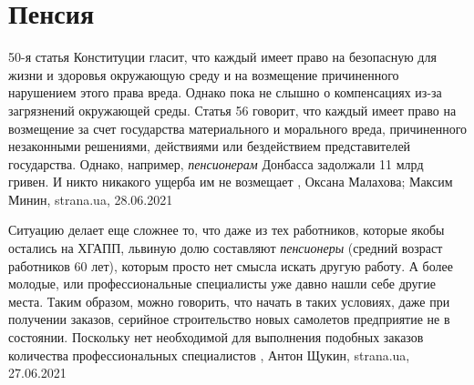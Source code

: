 
 
 
 
 
\chapter{Пенсия}
\label{sec:slova.pensia}

50-я статья Конституции гласит, что каждый имеет право на безопасную для жизни
и здоровья окружающую среду и на возмещение причиненного нарушением этого права
вреда.  Однако пока не слышно о компенсациях из-за загрязнений окружающей
среды.  Статья 56 говорит, что каждый имеет право на возмещение за счет
государства материального и морального вреда, причиненного незаконными
решениями, действиями или бездействием представителей государства.  Однако,
например, \emph{пенсионерам} Донбасса задолжали 11 млрд гривен. И никто
никакого ущерба им не возмещает
, 
Оксана Малахова; Максим Минин, strana.ua, 28.06.2021

Ситуацию делает еще сложнее то, что даже из тех работников, которые якобы
остались на ХГАПП, львиную долю составляют \emph{пенсионеры} (средний возраст
работников 60 лет), которым просто нет смысла искать другую работу. А более
молодые, или профессиональные специалисты уже давно нашли себе другие места.
Таким образом, можно говорить, что начать в таких условиях, даже при получении
заказов, серийное строительство новых самолетов предприятие не в состоянии.
Поскольку нет необходимой для выполнения подобных заказов количества
профессиональных специалистов
, Антон Щукин, strana.ua, 27.06.2021

